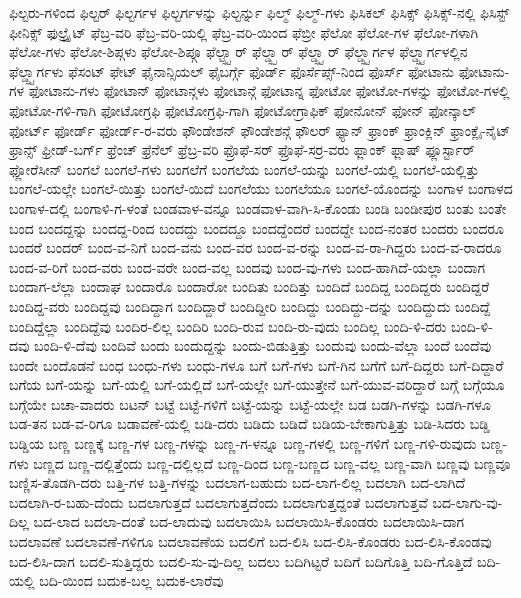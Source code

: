 {ಫಿಲ್ಟರು-ಗಳಿಂದ
ಫಿಲ್ಟರ್
ಫಿಲ್ಟರ್ಗಳ
ಫಿಲ್ಟರ್ಗಳನ್ನು
ಫಿಲ್ಟರ್ನ್ನು
ಫಿಲ್ಮ್
ಫಿಲ್ಮ್-ಗಳು
ಫಿಸಿಕಲ್
ಫಿಸಿಕ್ಸ್
ಫಿಸಿಕ್ಸ್-ನಲ್ಲಿ
ಫಿಸಿಸ್ಟ್
ಫೀನಿಕ್ಸ್
ಫುಲ್ಬ್ರೈಟ್
ಫೆಬ್ರ-ವರಿ
ಫೆಬ್ರ-ವರಿ-ಯಲ್ಲಿ
ಫೆಬ್ರ-ವರಿ-ಯಿಂದ
ಫೆಬ್ರೀ
ಫೆಲೋ
ಫೆಲೋ-ಗಳ
ಫೆಲೋ-ಗಳಾಗಿ
ಫೆಲೋ-ಗಳು
ಫೆಲೋ-ಶಿಪ್ಗಳು
ಫೆಲೋ-ಶಿಪ್ಗೂ
ಫೆಲ್ಟ್ಸ್ಟಾರ್
ಫೆಲ್ಡ್ಸ್ಪಾರ್
ಫೆಲ್ಡ್ಸ್ಟಾರ್
ಫೆಲ್ಡ್ಸ್ಟಾರ್ಗಳ
ಫೆಲ್ಡ್ಸ್ಟಾರ್ಗಳಲ್ಲಿನ
ಫೆಲ್ಡ್ಸ್ಟಾರ್ಗಳು
ಫೆಸಂಟ್
ಫೇಟ್
ಫೈನಾನ್ಸಿಯಲ್
ಫೈಬರ್ಗ್ಗೆ
ಫೊರ್ಡ್
ಫೊರ್ಸೆಪ್ಸ್-ನಿಂದ
ಫೊರ್ಸ್
ಫೋಟಾನು
ಫೋಟಾನು-ಗಳ
ಫೋಟಾನು-ಗಳು
ಫೋಟಾನ್
ಫೋಟಾನ್ಗಳು
ಫೋಟಾನ್ಗೆ
ಫೋಟಾನ್ನ
ಫೋಟೋ
ಫೋಟೋ-ಗಳನ್ನು
ಫೋಟೋ-ಗಳಲ್ಲಿ
ಫೋಟೋ-ಗಳಿ-ಗಾಗಿ
ಫೋಟೋಗ್ರಫಿ
ಫೋಟೋಗ್ರಫಿ-ಗಾಗಿ
ಫೋಟೋಗ್ರಾಫಿಕ್
ಫೋನೋನ್
ಫೋನ್
ಫೋನ್ಕಾಲ್
ಫೋರ್ಟ್
ಫೋರ್ಡ್
ಫೋರ್ಡ್-ರ-ವರು
ಫೌಂಡೇಶನ್
ಫೌಂಡೇಶನ್ಗೆ
ಫೌಲರ್
ಫ್ಯಾನ್
ಫ್ರಾಂಕ್
ಫ್ರಾಂಕ್ಲಿನ್
ಫ್ರಾಂಕ್ಲೈ-ನೈಟ್
ಫ್ರಾನ್ಸ್
ಫ್ರೀಡ್-ಬರ್ಗ್
ಫ್ರೆಂಚ್
ಫ್ರೆನೆಲ್
ಫ್ರೆಬ್ರ-ವರಿ
ಫ್ರೊಫೆ-ಸರ್
ಫ್ರೊಫೆ-ಸರ್ರ-ವರು
ಫ್ಲಾಂಕ್
ಫ್ಲಾಷ್
ಫ್ಲೂರ್ಸ್ಟಾರ್
ಫ್ಲೋರೆಸೀನ್
ಬಂಗಲೆ
ಬಂಗಲೆ-ಗಳು
ಬಂಗಲೆಗೆ
ಬಂಗಲೆಯ
ಬಂಗಲೆ-ಯನ್ನು
ಬಂಗಲೆ-ಯಲ್ಲಿ
ಬಂಗಲೆ-ಯಲ್ಲಿತ್ತು
ಬಂಗಲೆ-ಯಲ್ಲೇ
ಬಂಗಲೆ-ಯಿತ್ತು
ಬಂಗಲೆ-ಯಿದೆ
ಬಂಗಲೆಯು
ಬಂಗಲೆಯೂ
ಬಂಗಲೆ-ಯೊಂದನ್ನು
ಬಂಗಾಳ
ಬಂಗಾಳದ
ಬಂಗಾಳ-ದಲ್ಲಿ
ಬಂಗಾಳಿ-ಗ-ಳಂತೆ
ಬಂಡವಾಳ-ವನ್ನೂ
ಬಂಡವಾಳ-ವಾಗಿ-ಸಿ-ಕೊಂಡು
ಬಂಡಿ
ಬಂಡೀಪುರ
ಬಂತು
ಬಂತೇ
ಬಂದ
ಬಂದದ್ದನ್ನು
ಬಂದದ್ದ-ರಿಂದ
ಬಂದದ್ದು
ಬಂದದ್ದೂ
ಬಂದದ್ದೆಂದರೆ
ಬಂದದ್ದೇ
ಬಂದ-ನಂತರ
ಬಂದರು
ಬಂದರೂ
ಬಂದರೆ
ಬಂದರ್
ಬಂದ-ವ-ನಿಗೆ
ಬಂದ-ವನು
ಬಂದ-ವರ
ಬಂದ-ವ-ರನ್ನು
ಬಂದ-ವ-ರಾ-ಗಿದ್ದರು
ಬಂದ-ವ-ರಾದರೂ
ಬಂದ-ವ-ರಿಗೆ
ಬಂದ-ವರು
ಬಂದ-ವರೇ
ಬಂದ-ವಲ್ಲ
ಬಂದವು
ಬಂದ-ವು-ಗಳು
ಬಂದ-ಹಾಗಿದೆ-ಯಲ್ಲಾ
ಬಂದಾಗ
ಬಂದಾಗ-ಲೆಲ್ಲಾ
ಬಂದಾಘ
ಬಂದಾರೊ
ಬಂದಾರೋ
ಬಂದಿತು
ಬಂದಿತ್ತು
ಬಂದಿದೆ
ಬಂದಿದ್ದ
ಬಂದಿದ್ದರು
ಬಂದಿದ್ದರೆ
ಬಂದಿದ್ದ-ವರು
ಬಂದಿದ್ದವು
ಬಂದಿದ್ದಾಗ
ಬಂದಿದ್ದಾರೆ
ಬಂದಿದ್ದೀರಿ
ಬಂದಿದ್ದು
ಬಂದಿದ್ದು-ದನ್ನು
ಬಂದಿದ್ದುದು
ಬಂದಿದ್ದೆ
ಬಂದಿದ್ದೆಲ್ಲಾ
ಬಂದಿದ್ದೆವು
ಬಂದಿರ-ಲಿಲ್ಲ
ಬಂದಿರಿ
ಬಂದಿ-ರುವ
ಬಂದಿ-ರು-ವುದು
ಬಂದಿಲ್ಲ
ಬಂದಿ-ಳಿ-ದರು
ಬಂದಿ-ಳಿ-ದವು
ಬಂದಿ-ಳಿ-ದೆವು
ಬಂದಿವೆ
ಬಂದು
ಬಂದುದ್ದನ್ನು
ಬಂದು-ಬಿಡುತ್ತಿತ್ತು
ಬಂದುವು
ಬಂದು-ವೆಲ್ಲಾ
ಬಂದೆ
ಬಂದೆವು
ಬಂದೇ
ಬಂದೊಡನೆ
ಬಂಧ
ಬಂಧು-ಗಳು
ಬಂಧು-ಗಳೂ
ಬಗೆ
ಬಗೆ-ಗಳು
ಬಗೆ-ಗಿನ
ಬಗೆಗೆ
ಬಗೆ-ದಿದ್ದರು
ಬಗೆ-ದಿದ್ದಾರೆ
ಬಗೆಯ
ಬಗೆ-ಯನ್ನು
ಬಗೆ-ಯಲ್ಲಿ
ಬಗೆ-ಯಲ್ಲಿದೆ
ಬಗೆ-ಯಲ್ಲೇ
ಬಗೆ-ಯುತ್ತೇನೆ
ಬಗೆ-ಯುವ-ವರಿದ್ದಾರೆ
ಬಗ್ಗೆ
ಬಗ್ಗೆಯೂ
ಬಗ್ಗೆಯೇ
ಬಚಾ-ವಾದರು
ಬಟನ್
ಬಟ್ಟೆ
ಬಟ್ಟೆ-ಗಳಿಗೆ
ಬಟ್ಟೆ-ಯನ್ನು
ಬಟ್ಟೆ-ಯಲ್ಲೇ
ಬಡ
ಬಡಗಿ-ಗಳನ್ನು
ಬಡಗಿ-ಗಳೂ
ಬಡ-ತನ
ಬಡ-ವ-ರಿಗೂ
ಬಡಾವಣೆ-ಯಲ್ಲಿ
ಬಡಿ-ದರು
ಬಡಿದು
ಬಡಿದೆ
ಬಡಿಯ-ಬೇಕಾಗುತ್ತಿತ್ತು
ಬಡಿ-ಸಿದರು
ಬಡ್ಡಿ
ಬಡ್ಡಿಯ
ಬಣ್ಣ
ಬಣ್ಣಕ್ಕೆ
ಬಣ್ಣ-ಗಳ
ಬಣ್ಣ-ಗಳನ್ನು
ಬಣ್ಣ-ಗ-ಳನ್ನೂ
ಬಣ್ಣ-ಗಳಲ್ಲಿ
ಬಣ್ಣ-ಗಳಿಗೆ
ಬಣ್ಣ-ಗಳಿ-ರುವುದು
ಬಣ್ಣ-ಗಳು
ಬಣ್ಣದ
ಬಣ್ಣ-ದಲ್ಲಿತ್ತೆಂದು
ಬಣ್ಣ-ದಲ್ಲಿಲ್ಲದೆ
ಬಣ್ಣ-ದಿಂದ
ಬಣ್ಣ-ಬಣ್ಣದ
ಬಣ್ಣ-ವಲ್ಲ
ಬಣ್ಣ-ವಾಗಿ
ಬಣ್ಣವು
ಬಣ್ಣವೂ
ಬಣ್ಣಿಸ-ತೊಡಗಿ-ದರು
ಬತ್ತಿ-ಗಳ
ಬತ್ತಿ-ಗಳನ್ನು
ಬದಲಾಗ-ಬಹುದು
ಬದ-ಲಾಗ-ಲಿಲ್ಲ
ಬದಲಾಗಿ
ಬದ-ಲಾಗಿದೆ
ಬದಲಾಗಿ-ರ-ಬಹು-ದೆಂದು
ಬದಲಾಗುತ್ತದೆ
ಬದಲಾಗುತ್ತದೆಂದು
ಬದಲಾಗುತ್ತದ್ದಂತೆ
ಬದಲಾಗುತ್ತವೆ
ಬದ-ಲಾಗು-ವು-ದಿಲ್ಲ
ಬದ-ಲಾದ
ಬದಲಾ-ದಂತೆ
ಬದ-ಲಾದುವು
ಬದಲಾಯಿಸಿ
ಬದಲಾಯಿಸಿ-ಕೊಂಡರು
ಬದಲಾಯಿಸಿ-ದಾಗ
ಬದಲಾವಣೆ
ಬದಲಾವಣೆ-ಗಳಿಗೂ
ಬದಲಾವಣೆಯ
ಬದಲಿಗೆ
ಬದ-ಲಿಸಿ
ಬದ-ಲಿಸಿ-ಕೊಂಡರು
ಬದ-ಲಿಸಿ-ಕೊಂಡವು
ಬದ-ಲಿಸಿ-ದಾಗ
ಬದಲಿ-ಸುತ್ತಿದ್ದರು
ಬದಲಿ-ಸು-ವು-ದಿಲ್ಲ
ಬದಲು
ಬದಿಗಿಟ್ಟರೆ
ಬದಿಗೆ
ಬದಿಗೊತ್ತಿ
ಬದಿ-ಗೊತ್ತಿದೆ
ಬದಿ-ಯಲ್ಲಿ
ಬದಿ-ಯಿಂದ
ಬದುಕ-ಬಲ್ಲ
ಬದುಕ-ಲಾರೆವು
}
